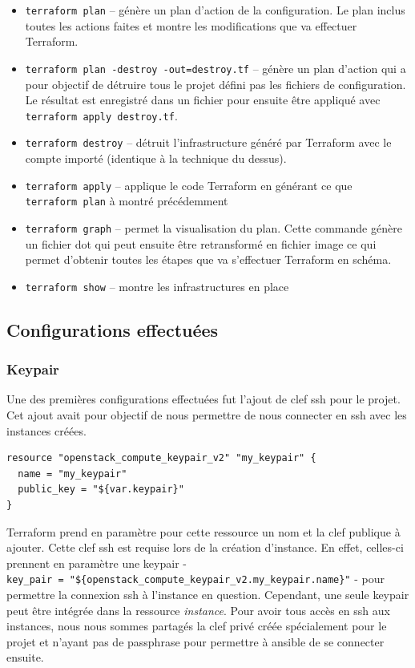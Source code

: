 \documentclass[]{article}
\providecommand{\tightlist}{%
  \setlength{\itemsep}{0pt}\setlength{\parskip}{0pt}}
\begin{document}
\begin{itemize}
\tightlist
\item
  \texttt{terraform\ plan} -- génère un plan d'action de la
  configuration. Le plan inclus toutes les actions faites et montre les
  modifications que va effectuer Terraform.
\item
  \texttt{terraform\ plan\ -destroy\ -out=destroy.tf} -- génère un plan
  d'action qui a pour objectif de détruire tous le projet défini pas les
  fichiers de configuration. Le résultat est enregistré dans un fichier
  pour ensuite être appliqué avec \texttt{terraform\ apply\ destroy.tf}.
\item
  \texttt{terraform\ destroy} -- détruit l'infrastructure généré par
  Terraform avec le compte importé (identique à la technique du dessus).
\item
  \texttt{terraform\ apply} -- applique le code Terraform en générant ce
  que \texttt{terraform\ plan} à montré précédemment
\item
  \texttt{terraform\ graph} -- permet la visualisation du plan. Cette
  commande génère un fichier dot qui peut ensuite être retransformé en
  fichier image ce qui permet d'obtenir toutes les étapes que va
  s'effectuer Terraform en schéma.
\item
  \texttt{terraform\ show} -- montre les infrastructures en place
\end{itemize}

\subsection{Configurations
effectuées}\label{configurations-effectuuxe9es}

\subsubsection{Keypair}\label{keypair}

Une des premières configurations effectuées fut l'ajout de clef ssh pour
le projet. Cet ajout avait pour objectif de nous permettre de nous
connecter en ssh avec les instances créées.
\begin{verbatim}
resource "openstack_compute_keypair_v2" "my_keypair" {
  name = "my_keypair"
  public_key = "${var.keypair}"
}
\end{verbatim}
Terraform prend en paramètre pour cette ressource un nom et la clef
publique à ajouter. Cette clef ssh est requise lors de la création
d'instance. En effet, celles-ci prennent en paramètre une keypair -
\texttt{key\_pair\ =\ "\$\{openstack\_compute\_keypair\_v2.my\_keypair.name\}"}
- pour permettre la connexion ssh à l'instance en question. Cependant,
une seule keypair peut être intégrée dans la ressource \emph{instance}.
Pour avoir tous accès en ssh aux instances, nous nous sommes partagés la
clef privé créée spécialement pour le projet et n'ayant pas de
passphrase pour permettre à ansible de se connecter ensuite.
\end{document}
